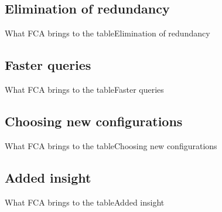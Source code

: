 \subsection{Elimination of redundancy}
\begin{frame}{What FCA brings to the table}{Elimination of redundancy}



\end{frame}

\subsection{Faster queries}
\begin{frame}{What FCA brings to the table}{Faster queries}
\end{frame}

\subsection{Choosing new configurations}
\begin{frame}{What FCA brings to the table}{Choosing new configurations}
\end{frame}


\subsection{Added insight}
\begin{frame}{What FCA brings to the table}{Added insight}
\end{frame}